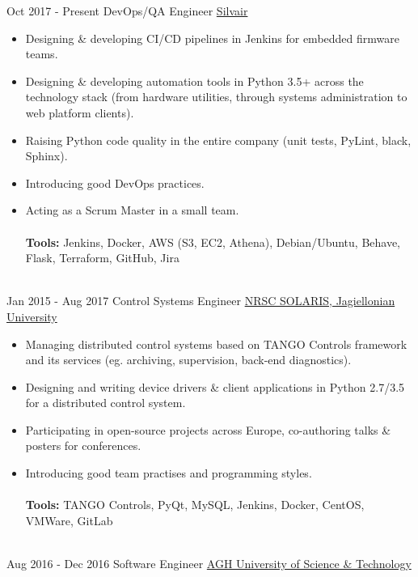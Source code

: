 \documentclass[letterpaper]{twentysecondcv} %
\begin{document}
\begin{twenty} %
\twentyitem
    	{Oct 2017 -}
		{Present}
        {DevOps/QA Engineer}
        {\href{http://www.silvair.com/}{Silvair}}
        {}
        {\begin{itemize}
        \item Designing \& developing CI/CD pipelines in Jenkins for embedded firmware teams.
        \item Designing \& developing automation tools in Python 3.5+ across the technology stack (from hardware utilities, through systems administration to web platform clients).
        \item Raising Python code quality in the entire company (unit tests, PyLint, black, Sphinx).
        \item Introducing good DevOps practices.
        \item Acting as a Scrum Master in a small team.
        \\\\
        \textbf{Tools:} Jenkins, Docker, AWS (S3, EC2, Athena), Debian/Ubuntu, Behave, Flask, Terraform, GitHub, Jira
        \end{itemize}}
        \\
	\twentyitem
    	{Jan 2015 -}
		{Aug 2017}
        {Control Systems Engineer}
        {\href{http://www.synchrotron.uj.edu.pl/en}{NRSC SOLARIS, Jagiellonian University}}
        {}
        {
        {\begin{itemize}
        \item Managing distributed control systems based on TANGO Controls framework and its services (eg. archiving, supervision, back-end diagnostics).
        \item Designing and writing device drivers \& client applications in Python 2.7/3.5 for a distributed control system.
        \item Participating in open-source projects across Europe, co-authoring talks \& posters for conferences.
        \item Introducing good team practises and programming styles.
    	\\\\
    	\textbf{Tools:} TANGO Controls, PyQt, MySQL, Jenkins, Docker, CentOS, VMWare, GitLab
    \end{itemize}}
        }
    \\   
    \twentyitem
   		{Aug 2016 -}
		{Dec 2016}
        {Software Engineer}
        {\href{http://www.eaiib.agh.edu.pl/}{AGH University of Science \& Technology}}

\end{twenty}
\end{document}
